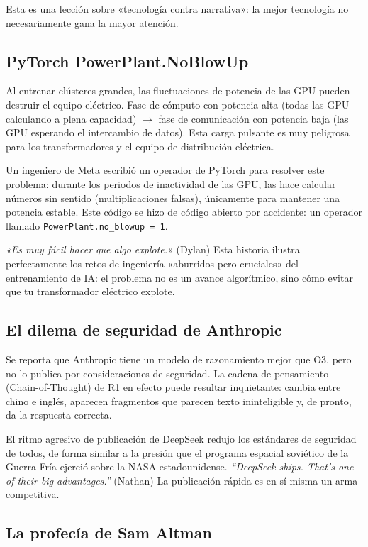 Esta es una lección sobre «tecnología contra narrativa»: la mejor tecnología no necesariamente gana la mayor atención.

\subsection{PyTorch PowerPlant.NoBlowUp}

Al entrenar clústeres grandes, las fluctuaciones de potencia de las GPU pueden destruir el equipo eléctrico. Fase de cómputo con potencia alta (todas las GPU calculando a plena capacidad) $\to$ fase de comunicación con potencia baja (las GPU esperando el intercambio de datos). Esta carga pulsante es muy peligrosa para los transformadores y el equipo de distribución eléctrica.

Un ingeniero de Meta escribió un operador de PyTorch para resolver este problema: durante los periodos de inactividad de las GPU, las hace calcular números sin sentido (multiplicaciones falsas), únicamente para mantener una potencia estable. Este código se hizo de código abierto por accidente: un operador llamado \texttt{PowerPlant.no\_blowup = 1}.

\textit{«Es muy fácil hacer que algo explote.»} (Dylan) Esta historia ilustra perfectamente los retos de ingeniería «aburridos pero cruciales» del entrenamiento de IA: el problema no es un avance algorítmico, sino cómo evitar que tu transformador eléctrico explote.

\subsection{El dilema de seguridad de Anthropic}

Se reporta que Anthropic tiene un modelo de razonamiento mejor que O3, pero no lo publica por consideraciones de seguridad. La cadena de pensamiento (Chain-of-Thought) de R1 en efecto puede resultar inquietante: cambia entre chino e inglés, aparecen fragmentos que parecen texto ininteligible y, de pronto, da la respuesta correcta.

El ritmo agresivo de publicación de DeepSeek redujo los estándares de seguridad de todos, de forma similar a la presión que el programa espacial soviético de la Guerra Fría ejerció sobre la NASA estadounidense. \textit{``DeepSeek ships. That's one of their big advantages.''} (Nathan) La publicación rápida es en sí misma un arma competitiva.

\subsection{La profecía de Sam Altman}


